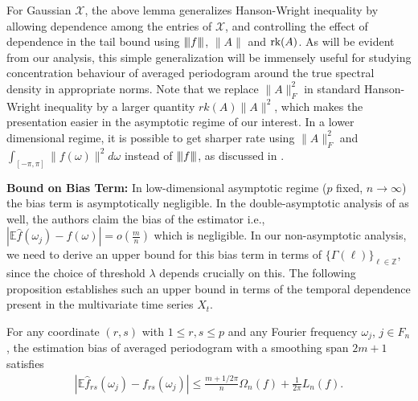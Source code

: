 \iffalse
\begin{remark}
In the above result, $rk(A)$ can be replaced by a smaller quantity $\|A\|_F/ \|A\|$ to make the bounds tighter. However, we use this form to  %
unify with the results for i.i.d. case (Lemma \ref{lemma:heavy_tail_hanson}) and dependent case (Proposition  \ref{lemma:heavy_tail_time_hanson}). 
\end{remark}
\fi

For Gaussian $\mathcal{X}$, the above lemma generalizes Hanson-Wright inequality by allowing dependence among the entries of $\mathcal{X}$, and controlling the effect of dependence in the tail bound using ${\left\vert\kern-0.25ex\left\vert\kern-0.25ex\left\vert f \right\vert\kern-0.25ex\right\vert\kern-0.25ex\right\vert}$, $\|A\|$ and $\mbox{rk}(A)$. As will be evident from our analysis, this simple generalization will be immensely useful for studying concentration behaviour of averaged periodogram around the true spectral density in appropriate norms. Note that we replace  $\|A\|_F^2$ in standard Hanson-Wright inequality by a larger quantity $rk(A) \|A\|^2$, which makes the presentation easier in the asymptotic regime of our interest. In a lower dimensional regime, it is possible to get sharper rate using $\|A\|_F^2$ and $\int_{[-\pi,\pi]} \|f(\omega)\|^2 d\omega$ instead of ${\left\vert\kern-0.25ex\left\vert\kern-0.25ex\left\vert f \right\vert\kern-0.25ex\right\vert\kern-0.25ex\right\vert}$, as discussed in \citet{Basu2015}. 
\smallskip
\par
\noindent \textbf{Bound on Bias Term: } In low-dimensional asymptotic regime ($p$ fixed, $n \rightarrow \infty$) the bias term is asymptotically negligible. In the double-asymptotic analysis of \citep{bohm2009shrinkage} as well, the  authors claim the bias of the estimator i.e., $|\mathbb{E}\hat{f}(\omega_j)-f(\omega)| = o(\frac{m}{n})$ which is negligible. In our non-asymptotic analysis, we need to derive an upper bound for this bias term in terms of $\{ \Gamma(\ell)\}_{\ell \in \mathbb{Z}}$, since the choice of threshold $\lambda$ depends crucially on this. The following proposition establishes such an  upper bound in terms of the temporal dependence present in the multivariate time series $X_t$. 

\begin{prop}
\label{prop:bias_bound}
For any coordinate $(r,s)$ with $1\le r,s\le p$ and any Fourier frequency $\omega_j$, $j\in F_n$, the estimation bias of averaged periodogram with a smoothing span $2m + 1$ satisfies
\begin{equation}
\begin{aligned}
\left|\mathbb{E}\hat{f}_{rs}(\omega_j) - f_{rs}(\omega_j)\right| \le \frac{m+1/2\pi}{n}\Omega_n(f) + \frac{1}{2\pi}L_n(f). \nonumber
\end{aligned}
\end{equation}
\end{prop}

